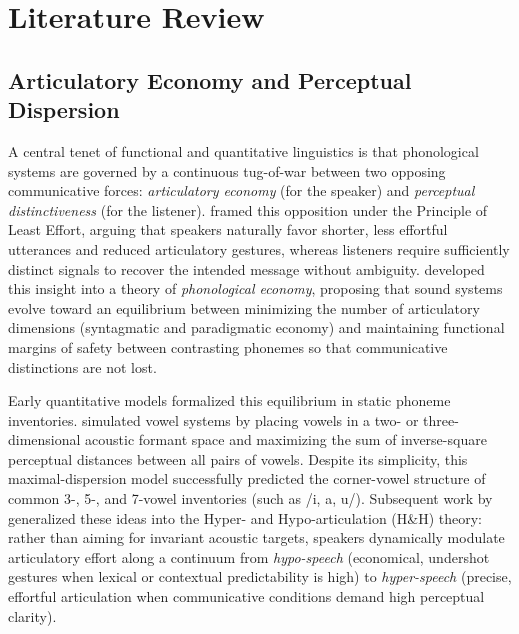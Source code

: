 \documentclass{interact}
\begin{document}
\section{Literature Review}
\subsection{Articulatory Economy and Perceptual Dispersion}
A central tenet of functional and quantitative linguistics is that phonological systems are governed by a continuous tug-of-war between two opposing communicative forces: \emph{articulatory economy} (for the speaker) and \emph{perceptual distinctiveness} (for the listener). \citet{zipf1949} framed this opposition under the Principle of Least Effort, arguing that speakers naturally favor shorter, less effortful utterances and reduced articulatory gestures, whereas listeners require sufficiently distinct signals to recover the intended message without ambiguity. \citet{martinet1955} developed this insight into a theory of \emph{phonological economy}, proposing that sound systems evolve toward an equilibrium between minimizing the number of articulatory dimensions (syntagmatic and paradigmatic economy) and maintaining functional margins of safety between contrasting phonemes so that communicative distinctions are not lost.

Early quantitative models formalized this equilibrium in static phoneme inventories. \citet{liljencrants1972} simulated vowel systems by placing vowels in a two- or three-dimensional acoustic formant space and maximizing the sum of inverse-square perceptual distances between all pairs of vowels. Despite its simplicity, this maximal-dispersion model successfully predicted the corner-vowel structure of common \mbox{3-}, \mbox{5-}, and \mbox{7-vowel} inventories (such as /i, a, u/). Subsequent work by \citet{lindblom1990} generalized these ideas into the Hyper- and Hypo-articulation (H\&H) theory: rather than aiming for invariant acoustic targets, speakers dynamically modulate articulatory effort along a continuum from \emph{hypo-speech} (economical, undershot gestures when lexical or contextual predictability is high) to \emph{hyper-speech} (precise, effortful articulation when communicative conditions demand high perceptual clarity).
\end{document}
